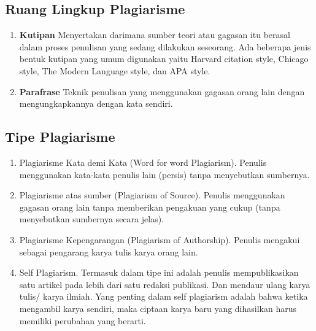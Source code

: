 \documentclass{article}
\begin{document}
\subsection{Ruang Lingkup Plagiarisme}
\begin{enumerate}
    \item \textbf{Kutipan} 
     \newline Menyertakan darimana sumber teori atau gagasan itu berasal dalam proses penulisan yang sedang dilakukan seseorang. Ada beberapa jenis bentuk kutipan yang umum digunakan yaitu Harvard citation style, Chicago style, The Modern Language style, dan APA style.
     \item \textbf{Parafrase}
     \newline Teknik penulisan yang menggunakan gagasan orang lain dengan mengungkapkannya dengan
kata sendiri.
\end{enumerate}

\subsection{Tipe Plagiarisme}
\begin{enumerate}
    \item Plagiarisme Kata demi Kata (Word for word Plagiarism). Penulis menggunakan kata-kata penulis lain (persis) tanpa menyebutkan sumbernya.
    \item Plagiarisme atas sumber (Plagiarism of Source). Penulis menggunakan gagasan orang lain tanpa memberikan pengakuan yang cukup (tanpa menyebutkan sumbernya secara jelas).
    \item Plagiarisme Kepengarangan (Plagiarism of Authorship). Penulis mengakui sebagai pengarang karya tulis karya orang lain.
    \item Self Plagiarism. Termasuk dalam tipe ini adalah penulis mempublikasikan satu artikel pada lebih dari satu redaksi publikasi. Dan mendaur ulang karya tulis/ karya ilmiah. Yang penting dalam self plagiarism adalah bahwa ketika mengambil karya sendiri, maka ciptaan karya baru yang dihasilkan harus memiliki perubahan yang berarti.

\end{enumerate}
\end{document}
